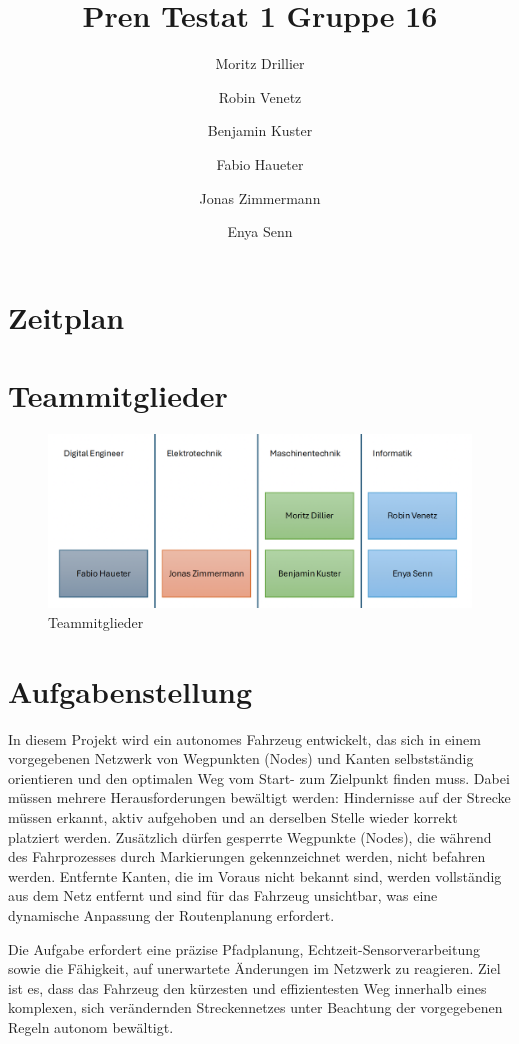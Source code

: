 \documentclass{article}
\title{Pren Testat 1 Gruppe 16}
\author{Moritz Drillier \and Robin Venetz \and Benjamin Kuster \and Fabio Haueter \and Jonas Zimmermann \and Enya Senn}
\date{\thedate}
\begin{document}
\maketitle

\tableofcontents 


\section{Zeitplan}

\section{Teammitglieder}
\begin{figure}[H]
    \centering
    \includegraphics[width=0.8\linewidth]{Images/Pren_Gruppe.png}
    \caption{Teammitglieder}
    \label{fig:enter-label}
\end{figure}


\section{Aufgabenstellung}
In diesem Projekt wird ein autonomes Fahrzeug entwickelt, das sich in einem vorgegebenen Netzwerk von Wegpunkten (Nodes) und Kanten selbstständig orientieren und den optimalen Weg vom Start- zum Zielpunkt finden muss. Dabei müssen mehrere Herausforderungen bewältigt werden: Hindernisse auf der Strecke müssen erkannt, aktiv aufgehoben und an derselben Stelle wieder korrekt platziert werden. Zusätzlich dürfen gesperrte Wegpunkte (Nodes), die während des Fahrprozesses durch Markierungen gekennzeichnet werden, nicht befahren werden. Entfernte Kanten, die im Voraus nicht bekannt sind, werden vollständig aus dem Netz entfernt und sind für das Fahrzeug unsichtbar, was eine dynamische Anpassung der Routenplanung erfordert.

\hfill \break
Die Aufgabe erfordert eine präzise Pfadplanung, Echtzeit-Sensorverarbeitung sowie die Fähigkeit, auf unerwartete Änderungen im Netzwerk zu reagieren. Ziel ist es, dass das Fahrzeug den kürzesten und effizientesten Weg innerhalb eines komplexen, sich verändernden Streckennetzes unter Beachtung der vorgegebenen Regeln autonom bewältigt.
\end{document}
